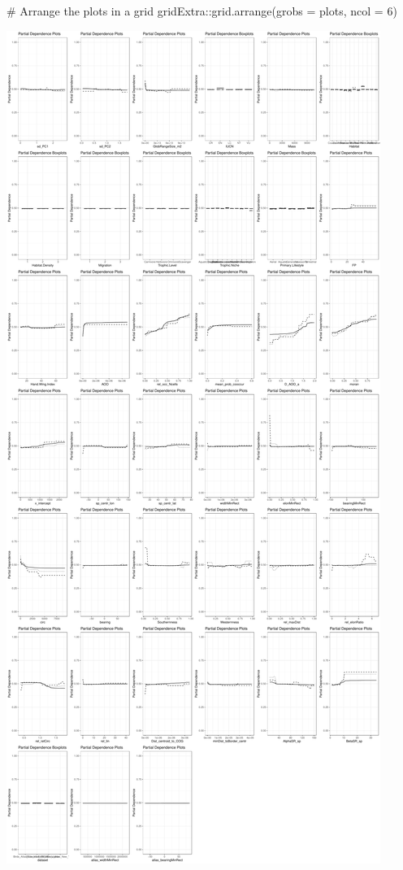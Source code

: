 \documentclass[
  letterpaper,
  DIV=11,
  numbers=noendperiod]{scrartcl}
\newenvironment{Shaded}{\begin{snugshade}}{\end{snugshade}}
\newcommand{\AttributeTok}[1]{\textcolor[rgb]{0.40,0.45,0.13}{#1}}
\newcommand{\CommentTok}[1]{\textcolor[rgb]{0.37,0.37,0.37}{#1}}
\newcommand{\DecValTok}[1]{\textcolor[rgb]{0.68,0.00,0.00}{#1}}
\newcommand{\FunctionTok}[1]{\textcolor[rgb]{0.28,0.35,0.67}{#1}}
\newcommand{\NormalTok}[1]{\textcolor[rgb]{0.00,0.23,0.31}{#1}}
\newcommand{\SpecialCharTok}[1]{\textcolor[rgb]{0.37,0.37,0.37}{#1}}
\begin{document}
\begin{Shaded}
\begin{Highlighting}[]
\CommentTok{\# Arrange the plots in a grid}
\NormalTok{gridExtra}\SpecialCharTok{::}\FunctionTok{grid.arrange}\NormalTok{(}\AttributeTok{grobs =}\NormalTok{ plots, }\AttributeTok{ncol =} \DecValTok{6}\NormalTok{)}
\end{Highlighting}
\end{Shaded}

\includegraphics{MachineLearning_StaticPatterNN_Report_files/figure-pdf/partial-dependence-plots-1.pdf}
\end{document}
